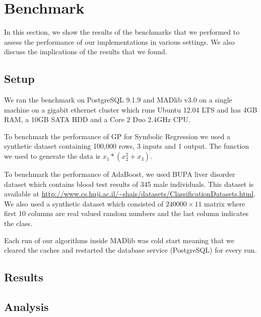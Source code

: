 
\section{Benchmark}
\label{sec:bench}
In this section, we show the results of the benchmarks that we performed to assess the performance of our implementations in various settings. We also discuss the implications of the results that we found.
\subsection{Setup}
We ran the benchmark on PostgreSQL 9.1.9 and MADlib v3.0 on a single machine on a gigabit  ethernet cluster which runs Ubuntu 12.04 LTS and has 4GB RAM, a 10GB SATA HDD and a Core 2 Duo 2.4GHz CPU. 

To benchmark the performance of GP for Symbolic Regression we used a synthetic dataset containing 100,000 rows, 3 inputs and 1 output. The function we used to generate the data is $x_1*(x_2^2+x_3)$.

To benchmark the performance of AdaBoost, we used BUPA liver disorder dataset which contains blood test results of 345 male individuals. This dataset is available at \url{http://www.cs.huji.ac.il/~shais/datasets/ClassificationDatasets.html}. We also used a synthetic dataset which consisted of $240000\times11$ matrix where first 10 columns are real valued random numbers and the last column indicates the class.

Each run of our algorithms inside MADlib was cold start meaning that we cleared the caches and restarted the database service (PostgreSQL) for every run.
\subsection{Results}
\subsection{Analysis}
